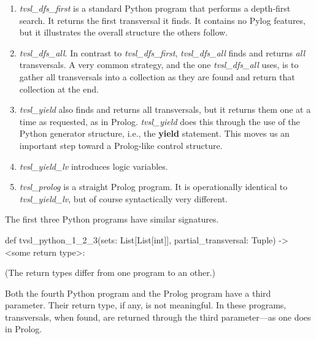 \begin{enumerate}
\item \textit{tvsl\_dfs\_first} is a standard Python program that performs a depth-first search. It returns the first transversal it finds. It contains no Pylog features, but it illustrates the overall structure the others follow. 

\item \textit{tvsl\_dfs\_all}. In contrast to \textit{tvsl\_dfs\_first}, \textit{tvsl\_dfs\_all} finds and returns \textit{all} transversals. A very common strategy, and the one \textit{tvsl\_dfs\_all} uses, is to gather all transversals into a collection as they are found and return that collection at the end.

\item \textit{tvsl\_yield} also finds and returns all transversals, but it returns them one at a time as requested, as in Prolog. \textit{tvsl\_yield} does this through the use of the Python generator structure, i.e., the \textbf{\textbf{yield}} statement. This moves us an important step toward a Prolog-like control structure.

\item \textit{tvsl\_yield\_lv} introduces logic variables.  

\item \textit{tvsl\_prolog} is a straight Prolog program. It is operationally identical to \textit{tvsl\_yield\_lv}, but of course syntactically very different. 
\end{enumerate}

The first three Python programs have similar signatures. 

\begin{python}
def tvsl_python_1_2_3(sets: List[List[int]], partial_transversal: Tuple) -> <some return type>: 
\end{python}
(The return types differ from one program to an other.)

Both the fourth Python program and the Prolog program have a third parameter. Their return type, if any, is not meaningful. In these programs, transversals, when found, are returned through the third parameter---as one does in Prolog.



